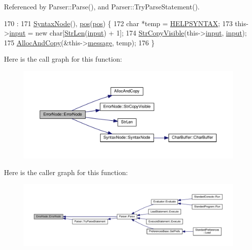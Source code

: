 Referenced by Parser\+::\+Parse(), and Parser\+::\+Try\+Parse\+Statement().


\begin{DoxyCode}
170                                                :
171     \hyperlink{classSyntaxNode_ac94372d402f38a118b4e8cd20ba7e520}{SyntaxNode}(), \hyperlink{classErrorNode_a2f9577d7885985f6a5671a14d64a75cf}{pos}(\hyperlink{classErrorNode_a2f9577d7885985f6a5671a14d64a75cf}{pos}) \{
172     \textcolor{keywordtype}{char} *temp = \hyperlink{text_8h_a466f4e6c46f3b09b46f495231a5afc9c}{HELPSYNTAX};
173     this->\hyperlink{classErrorNode_ac2cc563162c10fff090113340184bb4b}{input} = \textcolor{keyword}{new} \textcolor{keywordtype}{char}[\hyperlink{clib_8h_a67ec56eb98b49515d35005a5b3bf9a32}{StrLen}(\hyperlink{classErrorNode_ac2cc563162c10fff090113340184bb4b}{input}) + 1];
174     \hyperlink{classErrorNode_a2e51822b04905fc867d13546af61abb8}{StrCopyVisible}(this->\hyperlink{classErrorNode_ac2cc563162c10fff090113340184bb4b}{input}, \hyperlink{classErrorNode_ac2cc563162c10fff090113340184bb4b}{input});
175     \hyperlink{clib_8h_a5bed05c70cb17e541fee570b5dc32e1a}{AllocAndCopy}(&this->\hyperlink{classErrorNode_abd0f6fbd4876d013fbb7b6a9d5ce673e}{message}, temp);
176 \}
\end{DoxyCode}


Here is the call graph for this function\+:\nopagebreak
\begin{figure}[H]
\begin{center}
\leavevmode
\includegraphics[width=350pt]{classErrorNode_ac47d46061f61fb60a5c1cf2a61f24a44_cgraph}
\end{center}
\end{figure}




Here is the caller graph for this function\+:\nopagebreak
\begin{figure}[H]
\begin{center}
\leavevmode
\includegraphics[width=350pt]{classErrorNode_ac47d46061f61fb60a5c1cf2a61f24a44_icgraph}
\end{center}
\end{figure}


